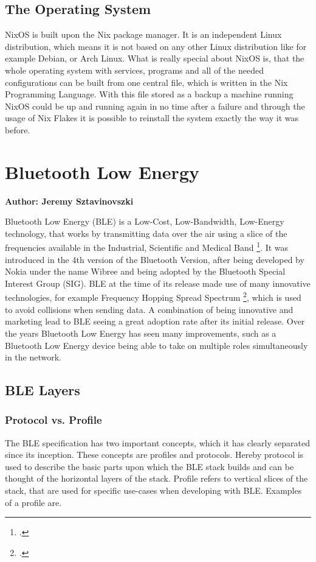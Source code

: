 \subsection{The Operating System}
NixOS is built upon the Nix package manager. It is an independent Linux distribution, which means it is not based on any other Linux distribution like for example Debian, or Arch Linux.
What is really special about NixOS is, that the whole operating system with services, programs and all of the needed configurations can be built from one central file, which is written in the Nix Programming Language.
With this file stored as a backup a machine running NixOS could be up and running again in no time after a failure and through the usage of Nix Flakes it is possible to reinstall the system exactly the way it was before.

\section{Bluetooth Low Energy}
\textbf{Author: Jeremy Sztavinovszki}

Bluetooth Low Energy (BLE) is a Low-Cost, Low-Bandwidth, Low-Energy technology, that works by transmitting data over the air using a slice of the frequencies available in the Industrial, Scientific and Medical Band \footcite{ism}.
It was introduced in the 4th version of the Bluetooth Version, after being developed by Nokia under the name Wibree and being adopted by the Bluetooth Special Interest Group (SIG). BLE at the time of its release made use of many
innovative technologies, for example Frequency Hopping Spread Spectrum \footcite{fhss}, which is used to avoid collisions when sending data. A combination of being innovative and marketing lead to BLE seeing a great adoption rate
after its initial release. Over the years Bluetooth Low Energy has seen many improvements, such as a Bluetooth Low Energy device being able to take on multiple roles simultaneously in the network.

\subsection{BLE Layers}
\subsubsection{Protocol vs. Profile}
The BLE specification has two important concepts, which it has clearly separated since its inception. These concepts are profiles and protocols. Hereby protocol is used to describe
the basic parts upon which the BLE stack builds and can be thought of the horizontal layers of the stack. Profile refers to vertical slices of the stack, that are used for specific use-cases when developing with BLE. Examples of a profile are.

